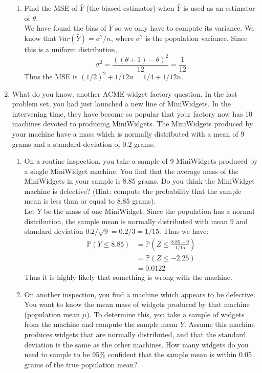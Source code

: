 \documentclass[12pt]{article}
\def\P{{\mathbb P}}
\begin{document}
\begin{enumerate}
\begin{enumerate}
\item Find the MSE of $\bar{Y}$ (the biased estimator) when $\bar{Y}$ is used as an estimator of $\theta$.\\

We have found the bias of $\bar{Y}$ so we only have to compute its variance. We know that $Var(\bar{Y}) = \sigma^2 / n$, where $\sigma^2$ is the population variance. Since this is a uniform distribution,
\[
\sigma^2 = \frac{((\theta + 1) - \theta)^2}{12} = \frac{1}{12}
\]
Thus the MSE is $(1/2)^2 + 1/12n = 1/4 + 1/12n$.
\end{enumerate}

\item What do you know, another ACME widget factory question. In the last problem set, you had just launched a new line of MiniWidgets. In the intervening time, they have become so popular that your factory now has 10 machines devoted to producing MiniWidgets. The MiniWidgets produced by your machine have a mass which is normally distributed with a mean of 9 grams and a standard deviation of 0.2 grams.
\begin{enumerate}
\item On a routine inspection, you take a sample of 9 MiniWidgets produced by a single MiniWidget machine. You find that the average mass of the MiniWidgets in your sample is 8.85 grams. Do you think the MiniWidget machine is defective? (Hint: compute the probability that the sample mean is less than or equal to 8.85 grams).\\

Let $Y$ be the mass of one MiniWidget. Since the population has a normal distribution, the sample mean is normally distributed with mean 9 and standard deviation $0.2 / \sqrt{9} = 0.2 / 3  = 1/15$. Thus we have:
\begin{align*}
\P(Y \leq 8.85) &= \P \left( Z \leq \frac{8.85 - 9}{1/15} \right) \\
&= \P(Z \leq -2.25) \\
&= 0.0122
\end{align*}
Thus it is highly likely that something is wrong with the machine.

\item On another inspection, you find a machine which appears to be defective. You want to know the mean mass of widgets produced by that machine (population mean $\mu$). To determine this, you take a sample of widgets from the machine and compute the sample mean $\bar{Y}$. Assume this machine produces widgets that are normally distributed, and that the standard deviation is the same as the other machines. How many widgets do you need to sample to be 95\% confident that the sample mean is within 0.05 grams of the true population mean?\\


\end{enumerate}
\end{enumerate}
\end{document}
